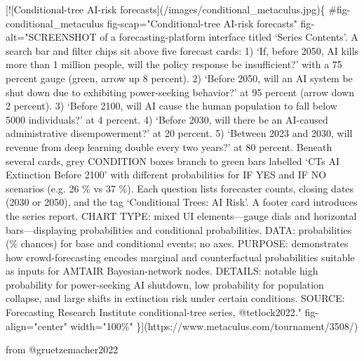 \documentclass[
  11pt,
  letterpaper,
]{book}
\newenvironment{Shaded}{\begin{snugshade}}{\end{snugshade}}
\newcommand{\CommentTok}[1]{\textcolor[rgb]{0.37,0.37,0.37}{#1}}
\newcommand{\NormalTok}[1]{\textcolor[rgb]{0.00,0.23,0.31}{#1}}
\newcommand{\OtherTok}[1]{\textcolor[rgb]{0.00,0.23,0.31}{#1}}
\begin{document}
\begin{Shaded}
\begin{Highlighting}[]
\CommentTok{[}\OtherTok{![Conditional{-}tree AI{-}risk forecasts}\CommentTok{](/images/conditional\_metaculus.jpg)}\NormalTok{\{}
\NormalTok{    \#fig{-}conditional\_metaculus}
\NormalTok{    fig{-}scap="Conditional{-}tree AI{-}risk forecasts"}
\NormalTok{    fig{-}alt="SCREENSHOT of a forecasting{-}platform interface titled ‘Series Contents’. A search bar and filter chips sit above five forecast cards: 1) ‘If, before 2050, AI kills more than 1 million people, will the policy response be insufficient?’ with a 75 percent gauge (green, arrow up 8 percent). 2) ‘Before 2050, will an AI system be shut down due to exhibiting power{-}seeking behavior?’ at 95 percent (arrow down 2 percent). 3) ‘Before 2100, will AI cause the human population to fall below 5000 individuals?’ at 4 percent. 4) ‘Before 2030, will there be an AI{-}caused administrative disempowerment?’ at 20 percent. 5) ‘Between 2023 and 2030, will revenue from deep learning double every two years?’ at 80 percent. Beneath several cards, grey CONDITION boxes branch to green bars labelled ‘CTs AI Extinction Before 2100’ with different probabilities for IF YES and IF NO scenarios (e.g. 26 \% vs 37 \%). Each question lists forecaster counts, closing dates (2030 or 2050), and the tag ‘Conditional Trees: AI Risk’. A footer card introduces the series report. CHART TYPE: mixed UI elements—gauge dials and horizontal bars—displaying probabilities and conditional probabilities. DATA: probabilities (\% chances) for base and conditional events; no axes. PURPOSE: demonstrates how crowd{-}forecasting encodes marginal and counterfactual probabilities suitable as inputs for AMTAIR Bayesian{-}network nodes. DETAILS: notable high probability for power{-}seeking AI shutdown, low probability for population collapse, and large shifts in extinction risk under certain conditions. SOURCE: Forecasting Research Institute conditional{-}tree series, @tetlock2022."}
\NormalTok{    fig{-}align="center"}
\NormalTok{    width="100\%"}
\NormalTok{\}](https://www.metaculus.com/tournament/3508/)}



\NormalTok{from @gruetzemacher2022}


\end{Highlighting}
\end{Shaded}
\end{document}
